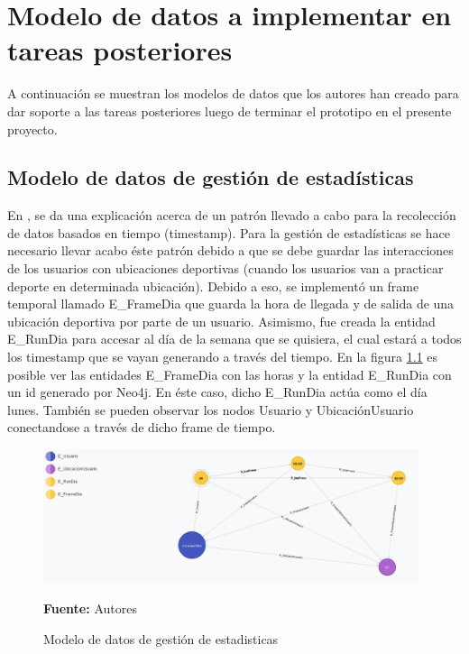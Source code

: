 \chapter{Modelo de datos a implementar en tareas posteriores}

A continuación se muestran los modelos de datos que los autores han creado para dar soporte a las tareas posteriores luego de terminar el prototipo en el presente proyecto.


\section{Modelo de datos de gestión de estadísticas}

En \cite{dependent_time_graphs}, se da una explicación acerca de un patrón llevado a cabo para la recolección de datos basados en tiempo (timestamp). Para la gestión de estadísticas se hace necesario llevar acabo éste patrón debido a que se debe guardar las interacciones de los usuarios con ubicaciones deportivas (cuando los usuarios van a practicar deporte en determinada ubicación). Debido a eso, se implementó un frame temporal llamado E\_FrameDia que guarda la hora de llegada y de salida de una ubicación deportiva por parte de un usuario. Asimismo, fue creada la entidad E\_RunDia para accesar al día de la semana que se quisiera, el cual estará a todos los timestamp que se vayan generando a través del tiempo. En la figura \ref{fig:modelo_datos_gestion_estadisticas} es posible ver las entidades E\_FrameDia con las horas y la entidad E\_RunDia con un id generado por Neo4j. En éste caso, dicho E\_RunDia actúa como el día lunes. También se pueden observar los nodos Usuario y UbicaciónUsuario conectandose a través de dicho frame de tiempo.

\begin{figure}[!htb]
  \begin{center}
    \includegraphics[width=11cm]{./imagenes/Modelo_de_datos/Gestion_estadisticas.png}
    \caption{Modelo de datos de gestión de estadisticas}
    \label{fig:modelo_datos_gestion_estadisticas}
    \textbf{Fuente:}  Autores \\
  \end{center}
\end{figure}


